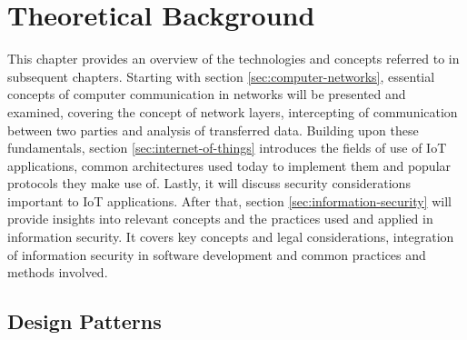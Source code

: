 \chapter{Theoretical Background}
\label{chap:theoretical-background}
This chapter provides an overview of the technologies and concepts referred to in subsequent chapters.
Starting with section \ref{sec:computer-networks}, essential concepts of computer communication in networks will be presented and examined, covering the concept of network layers, intercepting of communication between two parties and analysis of transferred data.
Building upon these fundamentals, section \ref{sec:internet-of-things} introduces the fields of use of \ac{IoT} applications, common architectures used today to implement them and popular protocols they make use of. Lastly, it will discuss security considerations important to \ac{IoT} applications.
After that, section \ref{sec:information-security} will provide insights into relevant concepts and the practices used and applied in information security. It covers key concepts and legal considerations, integration of information security in software development and common practices and methods involved. %


\section{Design Patterns}

